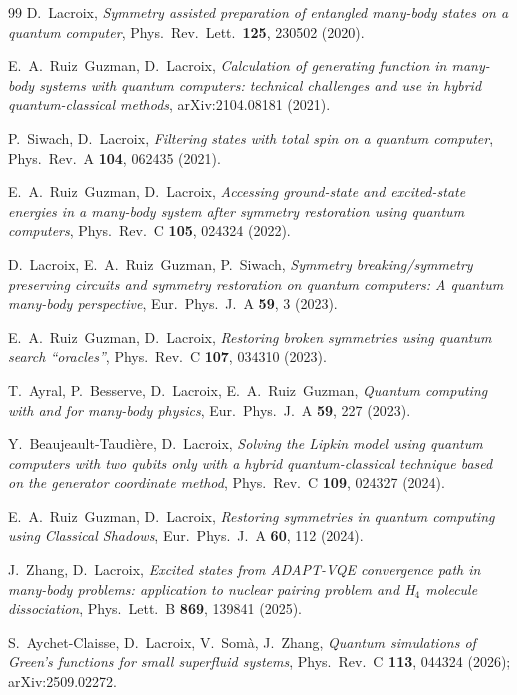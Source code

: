 \documentclass[
  aps,            %
  prc,            %
  reprint,        %
  superscriptaddress,
  floatfix,
  nofootinbib
]{revtex4-2}
\begin{document}
\begin{thebibliography}{99}
D.~Lacroix,
\textit{Symmetry assisted preparation of entangled many-body states on a quantum computer},
Phys.\ Rev.\ Lett.\ \textbf{125}, 230502 (2020).

E.~A.~Ruiz~Guzman, D.~Lacroix,
\textit{Calculation of generating function in many-body systems with quantum computers: technical challenges and use in hybrid quantum-classical methods},
arXiv:2104.08181 (2021).

P.~Siwach, D.~Lacroix,
\textit{Filtering states with total spin on a quantum computer},
Phys.\ Rev.\ A \textbf{104}, 062435 (2021).

E.~A.~Ruiz~Guzman, D.~Lacroix,
\textit{Accessing ground-state and excited-state energies in a many-body system after symmetry restoration using quantum computers},
Phys.\ Rev.\ C \textbf{105}, 024324 (2022).

D.~Lacroix, E.~A.~Ruiz~Guzman, P.~Siwach,
\textit{Symmetry breaking/symmetry preserving circuits and symmetry restoration on quantum computers: A quantum many-body perspective},
Eur.\ Phys.\ J.\ A \textbf{59}, 3 (2023).

E.~A.~Ruiz~Guzman, D.~Lacroix,
\textit{Restoring broken symmetries using quantum search ``oracles''},
Phys.\ Rev.\ C \textbf{107}, 034310 (2023).

T.~Ayral, P.~Besserve, D.~Lacroix, E.~A.~Ruiz~Guzman,
\textit{Quantum computing with and for many-body physics},
Eur.\ Phys.\ J.\ A \textbf{59}, 227 (2023).

Y.~Beaujeault-Taudi\`ere, D.~Lacroix,
\textit{Solving the Lipkin model using quantum computers with two qubits only with a hybrid quantum-classical technique based on the generator coordinate method},
Phys.\ Rev.\ C \textbf{109}, 024327 (2024).

E.~A.~Ruiz~Guzman, D.~Lacroix,
\textit{Restoring symmetries in quantum computing using Classical Shadows},
Eur.\ Phys.\ J.\ A \textbf{60}, 112 (2024).

J.~Zhang, D.~Lacroix,
\textit{Excited states from ADAPT-VQE convergence path in many-body problems: application to nuclear pairing problem and H$_4$ molecule dissociation},
Phys.\ Lett.\ B \textbf{869}, 139841 (2025).

S.~Aychet-Claisse, D.~Lacroix, V.~Som\`a, J.~Zhang,
\textit{Quantum simulations of Green's functions for small superfluid systems},
Phys.\ Rev.\ C \textbf{113}, 044324 (2026); arXiv:2509.02272.


\end{thebibliography}
\end{document}
